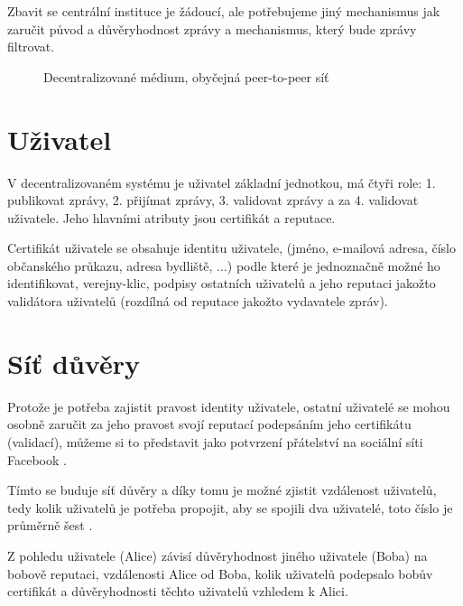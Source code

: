 \documentclass{report}
\begin{document}
Zbavit se centrální instituce je žádoucí, ale potřebujeme jiný mechanismus jak zaručit původ a důvěryhodnost zprávy a mechanismus, který bude zprávy filtrovat.

\begin{figure}
\centering
{}
\caption{Decentralizované médium, obyčejná \gls{peer-to-peer} síť}
\end{figure}

\section{Uživatel}
\label{sec:uzivatel}
V decentralizovaném systému je uživatel základní jednotkou, má čtyři role: 1. publikovat zprávy, 2. přijímat zprávy, 3. validovat zprávy a za 4. validovat uživatele. Jeho hlavními atributy jsou certifikát a reputace.

Certifikát uživatele se obsahuje identitu uživatele, (jméno, e-mailová adresa, číslo občanského průkazu, adresa bydliště, ...) podle které je jednoznačně možné ho identifikovat, \gls{verejny-klic}, podpisy ostatních uživatelů a jeho reputaci jakožto validátora uživatelů (rozdílná od reputace jakožto vydavatele zpráv).

\section{Síť důvěry}
\label{sec:sit_duvery}

Protože je potřeba zajistit pravost identity uživatele, ostatní uživatelé se mohou osobně zaručit za jeho pravost svojí reputací podepsáním jeho certifikátu (validací), můžeme si to představit jako potvrzení přátelství na sociální síti Facebook \citep{intro99}.

Tímto se buduje síť důvěry a díky tomu je možné zjistit vzdálenost uživatelů, tedy kolik uživatelů je potřeba propojit, aby se spojili dva uživatelé, toto číslo je průměrně šest \citep{intro99}.

Z pohledu uživatele (Alice) závisí důvěryhodnost jiného uživatele (Boba) na bobově reputaci, vzdálenosti Alice od Boba, kolik uživatelů podepsalo bobův certifikát a důvěryhodnosti těchto uživatelů vzhledem k Alici.
\end{document}
